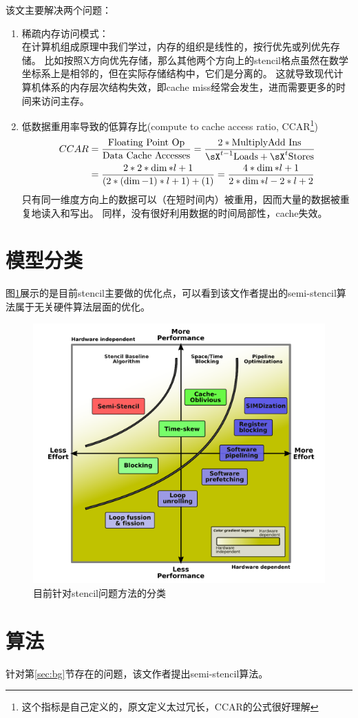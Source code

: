 \documentclass[reportComp,bib]{thesis}
\begin{document}
该文主要解决两个问题：
\begin{enumerate}
	\item 稀疏内存访问模式：\\
在计算机组成原理中我们学过，内存的组织是线性的，按行优先或列优先存储。
比如按照X方向优先存储，那么其他两个方向上的stencil格点虽然在数学坐标系上是相邻的，但在实际存储结构中，它们是分离的。
这就导致现代计算机体系的内存层次结构失效，即cache miss经常会发生，进而需要更多的时间来访问主存。

	\item 低数据重用率导致的低算存比(compute to cache access ratio, CCAR\footnote{这个指标是自己定义的，原文定义太过冗长，CCAR的公式很好理解})
\begin{equation}
\label{equ:ccar}
\begin{aligned}
CCAR&=\frac{\text{Floating Point Op}}{\text{Data Cache Accesses}}=\frac{2*\text{MultiplyAdd Ins}}{\sX^{t-1}\text{Loads}+\sX^{t}\text{Stores}}\\
&=\frac{2*2*\dim*l+1}{(2*(\dim-1)*l+1)+(1)}=\frac{4*\dim*l+1}{2*\dim*l-2*l+2}
\end{aligned}
\end{equation}
只有同一维度方向上的数据可以（在短时间内）被重用，因而大量的数据被重复地读入和写出。
同样，没有很好利用数据的时间局部性，cache失效。
\end{enumerate}

\section{模型分类}
图\ref{fig:catalog}展示的是目前stencil主要做的优化点，可以看到该文作者提出的semi-stencil算法属于无关硬件算法层面的优化。
\begin{figure}[H]
\centering
\includegraphics[width=0.5\linewidth]{fig/schemes.PNG}
\caption{目前针对stencil问题方法的分类}
\label{fig:catalog}
\end{figure}

\section{算法}
针对第\ref{sec:bg}节存在的问题，该文作者提出semi-stencil算法。
\end{document}
